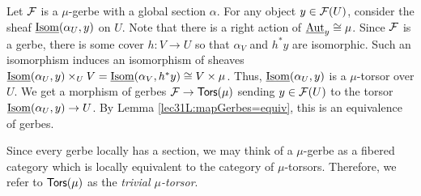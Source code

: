 \begin{remark}
 Let $\mathcal{F}$ is a $\mu$-gerbe with a global section $\alpha$. For any object $y\in \mathcal{F}(U)$, consider the sheaf $\operatorname{\underline{Isom}}(\alpha_U,y)$ on $U$. Note that there is a right action of $\operatorname{\underline{Aut}}_y\cong \mu$. Since $\mathcal{F}$ is a gerbe, there is some cover $h:V\to U$ so that $\alpha_V$ and $h^*y$ are isomorphic. Such an isomorphism induces an isomorphism of sheaves $\operatorname{\underline{Isom}}(\alpha_U,y)\times_U V=\operatorname{\underline{Isom}}(\alpha_V,h^*y)\cong V\times \mu$. Thus, $\operatorname{\underline{Isom}}(\alpha_U,y)$ is a $\mu$-torsor over $U$. We get a morphism of gerbes $\mathcal{F}\to \text{\sf Tors}(\mu)$ sending $y\in \mathcal{F}(U)$ to the torsor $\operatorname{\underline{Isom}}(\alpha_U,y)\to U$. By Lemma \ref{lec31L:mapGerbes=equiv}, this is an equivalence of gerbes.

 Since every gerbe locally has a section, we may think of a $\mu$-gerbe as a fibered category which is locally equivalent to the category of $\mu$-torsors. Therefore, we refer to $\text{\sf Tors}(\mu)$ as the \emph{trivial $\mu$-torsor}.
\end{remark}


